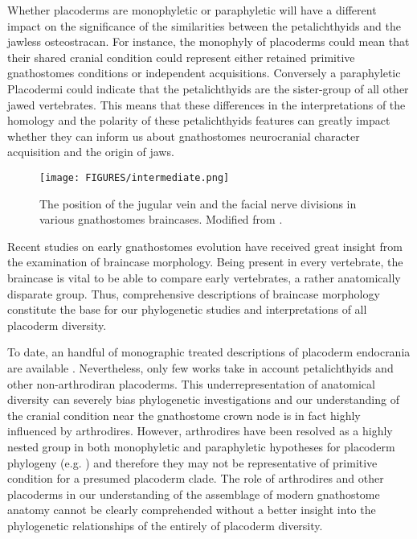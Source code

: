\documentclass[11pt,letterpaper]{report}
\begin{document}
Whether placoderms are monophyletic or paraphyletic will have a different impact on the significance of the similarities between the petalichthyids and the jawless osteostracan. For instance, the monophyly of placoderms could mean that their shared cranial condition could represent either retained primitive gnathostomes conditions or independent acquisitions. Conversely a paraphyletic Placodermi could indicate that the petalichthyids are the sister-group of all other jawed vertebrates.  This means that these differences in the interpretations of the homology and the polarity of these petalichthyids features can greatly impact whether they can inform us about gnathostomes neurocranial character acquisition and the origin of jaws.

\begin{figure}[!h]
\centering
    \texttt{[image: FIGURES/intermediate.png]}
\caption{\footnotesize{The position of the jugular vein and the facial nerve divisions in various gnathostomes braincases. Modified from \citep{brazeau2014characters}.}}
\label{placocomparison}
\end{figure}

Recent studies on early gnathostomes evolution have received great insight from the examination of braincase morphology. Being present in every vertebrate, the braincase is vital to be able to compare early vertebrates, a rather anatomically disparate group. Thus, comprehensive descriptions of braincase morphology constitute the base for our phylogenetic studies and interpretations of all placoderm diversity. 

To date, an handful of monographic treated descriptions of placoderm endocrania are available \citep{Stensi1925,Stensi1950,Stensi1963b,Stensi1969,Young1980,Goujet1984a}. Nevertheless, only few works take in account petalichthyids and other non-arthrodiran placoderms. This underrepresentation of anatomical diversity can severely bias phylogenetic investigations and our understanding of the cranial condition near the gnathostome crown node is in fact highly influenced by arthrodires. However, arthrodires have been resolved as a highly nested group in both monophyletic and paraphyletic hypotheses for placoderm phylogeny (e.g. \citealt{Denison1978,goujet2004placoderm,zhu2013silurian,giles2015osteichthyan}) and therefore they may not be representative of primitive condition for a presumed placoderm clade. The role of arthrodires and other placoderms in our understanding of the assemblage of modern gnathostome anatomy cannot be clearly comprehended without a better insight into the phylogenetic relationships of the entirely of placoderm diversity.  
\end{document}
